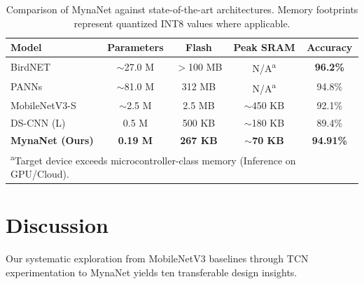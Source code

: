 \documentclass[final,5p,times,twocolumn,nolinenum]{elsarticle}
\begin{document}
\begin{table}[t]
	\caption{Comparison of MynaNet against state-of-the-art architectures. Memory footprints represent quantized INT8 values where applicable.}
	\label{tab:comparison}
	\centering
	\footnotesize
	\setlength{\tabcolsep}{4pt} %
	\renewcommand{\arraystretch}{1.1} %
	\begin{tabular}{l c c c c}
		\toprule
		\textbf{Model} & \textbf{Parameters} & \textbf{Flash} & \textbf{Peak SRAM} & \textbf{Accuracy} \\
		\midrule
		BirdNET \cite{kahl2021birdnet} & $\sim$27.0 M & $>$100 MB & N/A\textsuperscript{a} & \textbf{96.2\%} \\
		PANNs \cite{kong2020panns} & $\sim$81.0 M & 312 MB & N/A\textsuperscript{a} & 94.8\% \\
		MobileNetV3-S \cite{howard2019searching} & $\sim$2.5 M & 2.5 MB & $\sim$450 KB & 92.1\% \\
		DS-CNN (L) \cite{zhang2017hello} & 0.5 M & 500 KB & $\sim$180 KB & 89.4\% \\
		\midrule
		\textbf{MynaNet (Ours)} & \textbf{0.19 M} & \textbf{267 KB} & \textbf{$\sim$70 KB} & \textbf{94.91\%} \\
		\bottomrule
		\multicolumn{5}{l}{\textsuperscript{a}\tiny Target device exceeds microcontroller-class memory (Inference on GPU/Cloud).}
	\end{tabular}
\end{table}

\section{Discussion}
\label{sec:discussion}

Our systematic exploration from MobileNetV3 baselines through TCN
experimentation to MynaNet yields ten transferable design insights.
\end{document}

